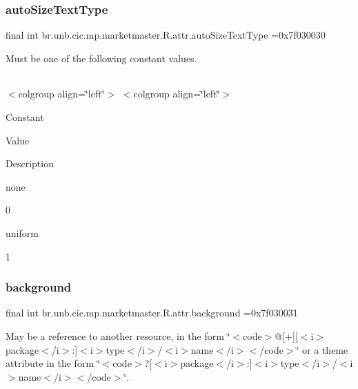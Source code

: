 \subsubsection{\texorpdfstring{auto\+Size\+Text\+Type}{autoSizeTextType}}
{\footnotesize\ttfamily final int br.\+unb.\+cic.\+mp.\+marketmaster.\+R.\+attr.\+auto\+Size\+Text\+Type =0x7f030030\hspace{0.3cm}{\ttfamily [static]}}

Must be one of the following constant values.

\tabulinesep=1mm
\begin{longtabu} spread 0pt [c]{*{0}{|X[-1]}|}
\hline
\end{longtabu}
$<$colgroup align=\char`\"{}left\char`\"{}$>$ $<$colgroup align=\char`\"{}left\char`\"{}$>$ 

Constant

Value

Description 

none

0

uniform

1\mbox{\label{classbr_1_1unb_1_1cic_1_1mp_1_1marketmaster_1_1R_1_1attr_a8d362a1faf87028d4786170d2dd29744}} 
\subsubsection{\texorpdfstring{background}{background}}
{\footnotesize\ttfamily final int br.\+unb.\+cic.\+mp.\+marketmaster.\+R.\+attr.\+background =0x7f030031\hspace{0.3cm}{\ttfamily [static]}}

May be a reference to another resource, in the form \char`\"{}$<$code$>$@\mbox{[}+\mbox{]}\mbox{[}$<$i$>$package$<$/i$>$\+:\mbox{]}$<$i$>$type$<$/i$>$/$<$i$>$name$<$/i$>$$<$/code$>$\char`\"{} or a theme attribute in the form \char`\"{}$<$code$>$?\mbox{[}$<$i$>$package$<$/i$>$\+:\mbox{]}$<$i$>$type$<$/i$>$/$<$i$>$name$<$/i$>$$<$/code$>$\char`\"{}. \mbox{\label{classbr_1_1unb_1_1cic_1_1mp_1_1marketmaster_1_1R_1_1attr_a180997e04663d3612a5e5d0d63b7db7f}} 
